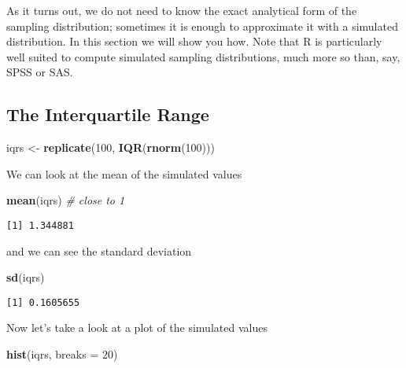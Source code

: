 \documentclass[]{book}
\newenvironment{Shaded}{\begin{snugshade}}{\end{snugshade}}
\newcommand{\KeywordTok}[1]{\textcolor[rgb]{0.13,0.29,0.53}{\textbf{{#1}}}}
\newcommand{\DataTypeTok}[1]{\textcolor[rgb]{0.13,0.29,0.53}{{#1}}}
\newcommand{\DecValTok}[1]{\textcolor[rgb]{0.00,0.00,0.81}{{#1}}}
\newcommand{\StringTok}[1]{\textcolor[rgb]{0.31,0.60,0.02}{{#1}}}
\newcommand{\CommentTok}[1]{\textcolor[rgb]{0.56,0.35,0.01}{\textit{{#1}}}}
\newcommand{\NormalTok}[1]{{#1}}
\numberwithin{equation}{chapter}
\numberwithin{figure}{chapter}
\theoremstyle{plain}
\theoremstyle{definition}
\theoremstyle{remark}
\theoremstyle{definition}
\theoremstyle{definition}
\theoremstyle{remark}
\begin{document}
As it turns out, we do not need to know the exact analytical form of the
sampling distribution; sometimes it is enough to approximate it with a
simulated distribution. In this section we will show you how. Note that
R is particularly well suited to compute simulated sampling
distributions, much more so than, say, SPSS or SAS.

\subsection{The Interquartile Range}\label{the-interquartile-range}

\begin{Shaded}
\begin{Highlighting}[]
\NormalTok{iqrs <-}\StringTok{ }\KeywordTok{replicate}\NormalTok{(}\DecValTok{100}\NormalTok{, }\KeywordTok{IQR}\NormalTok{(}\KeywordTok{rnorm}\NormalTok{(}\DecValTok{100}\NormalTok{)))}
\end{Highlighting}
\end{Shaded}

We can look at the mean of the simulated values

\begin{Shaded}
\begin{Highlighting}[]
\KeywordTok{mean}\NormalTok{(iqrs)    }\CommentTok{# close to 1}
\end{Highlighting}
\end{Shaded}

\begin{verbatim}
[1] 1.344881
\end{verbatim}

and we can see the standard deviation

\begin{Shaded}
\begin{Highlighting}[]
\KeywordTok{sd}\NormalTok{(iqrs)}
\end{Highlighting}
\end{Shaded}

\begin{verbatim}
[1] 0.1605655
\end{verbatim}

Now let's take a look at a plot of the simulated values

\begin{Shaded}
\begin{Highlighting}[]
\KeywordTok{hist}\NormalTok{(iqrs, }\DataTypeTok{breaks =} \DecValTok{20}\NormalTok{)}
\end{Highlighting}
\end{Shaded}
\end{document}
